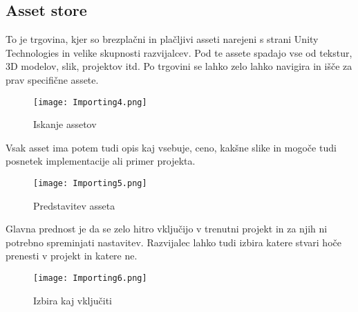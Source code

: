 {\color{indiagreen}\subsection{Asset store}}
To je trgovina, kjer so brezplačni in plačljivi asseti narejeni s strani Unity Technologies in velike skupnosti razvijalcev. Pod te assete spadajo vse od tekstur, 3D modelov, slik, projektov itd. Po trgovini se lahko zelo lahko navigira in išče za prav specifične assete.\\
\begin{figure}[ht!]
	\centering
	\texttt{[image: Importing4.png]}
	\caption{Iskanje assetov}
\end{figure}
Vsak asset ima potem tudi opis kaj vsebuje, ceno, kakšne slike in mogoče tudi posnetek implementacije ali primer projekta.\\
\begin{figure}[ht!]
	\centering
	\texttt{[image: Importing5.png]}
	\caption{Predstavitev asseta}
\end{figure}
Glavna prednost je da se zelo hitro vključijo v trenutni projekt in za njih ni potrebno spreminjati nastavitev. Razvijalec lahko tudi izbira katere stvari hoče prenesti v projekt in katere ne.\\
\begin{figure}[ht!]
	\centering
	\texttt{[image: Importing6.png]}
	\caption{Izbira kaj vključiti}
\end{figure}